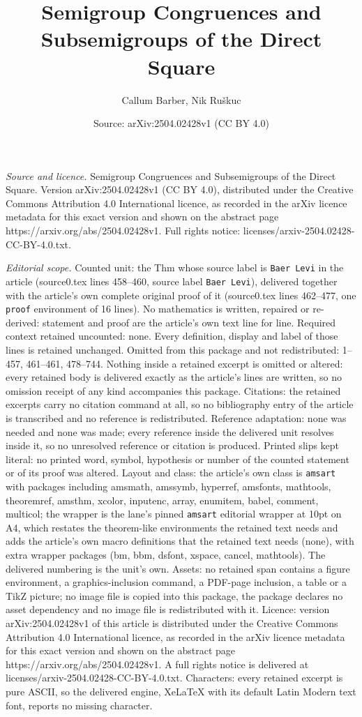 \documentclass[10pt,a4paper]{amsart}
\title[Semigroup Congruences and Subsemigroups of the Direct Square]{Semigroup Congruences and Subsemigroups of the Direct Square}
\author{Callum Barber, Nik Ru\v{s}kuc}
\date{Source: arXiv:2504.02428v1 (CC BY 4.0)}
\begin{document}
\maketitle

\noindent\emph{Source and licence.} Semigroup Congruences and Subsemigroups of the Direct Square. Version arXiv:2504.02428v1 (CC BY 4.0), distributed under the Creative Commons Attribution 4.0 International licence, as recorded in the arXiv licence metadata for this exact version and shown on the abstract page https://arxiv.org/abs/2504.02428v1. Full rights notice: licenses/arxiv-2504.02428-CC-BY-4.0.txt.\par\smallskip

\noindent\textit{Editorial scope.} Counted unit: the Thm whose source label is \texttt{Baer Levi} in the article (source0.tex lines 458--460, source label \texttt{Baer Levi}), delivered together with the article's own complete original proof of it (source0.tex lines 462--477, one \texttt{proof} environment of 16 lines). No mathematics is written, repaired or re-derived: statement and proof are the article's own text line for line. Required context retained uncounted: none. Every definition, display and label of those lines is retained unchanged. Omitted from this package and not redistributed: 1--457, 461--461, 478--744. Nothing inside a retained excerpt is omitted or altered: every retained body is delivered exactly as the article's lines are written, so no omission receipt of any kind accompanies this package. Citations: the retained excerpts carry no citation command at all, so no bibliography entry of the article is transcribed and no reference is redistributed. Reference adaptation: none was needed and none was made; every reference inside the delivered unit resolves inside it, so no unresolved reference or citation is produced. Printed slips kept literal: no printed word, symbol, hypothesis or number of the counted statement or of its proof was altered. Layout and class: the article's own class is \texttt{amsart} with packages including amsmath, amssymb, hyperref, amsfonts, mathtools, theoremref, amsthm, xcolor, inputenc, array, enumitem, babel, comment, multicol; the wrapper is the lane's pinned \texttt{amsart} editorial wrapper at 10pt on A4, which restates the theorem-like environments the retained text needs and adds the article's own macro definitions that the retained text needs (none), with extra wrapper packages (bm, bbm, dsfont, xspace, cancel, mathtools). The delivered numbering is the unit's own. Assets: no retained span contains a figure environment, a graphics-inclusion command, a PDF-page inclusion, a table or a TikZ picture; no image file is copied into this package, the package declares no asset dependency and no image file is redistributed with it. Licence: version arXiv:2504.02428v1 of this article is distributed under the Creative Commons Attribution 4.0 International licence, as recorded in the arXiv licence metadata for this exact version and shown on the abstract page https://arxiv.org/abs/2504.02428v1. A full rights notice is delivered at licenses/arxiv-2504.02428-CC-BY-4.0.txt. Characters: every retained excerpt is pure ASCII, so the delivered engine, XeLaTeX with its default Latin Modern text font, reports no missing character.
\end{document}
